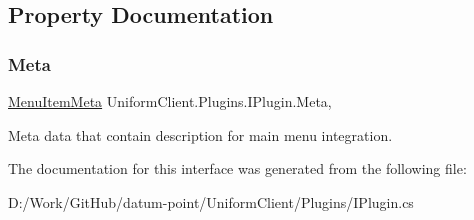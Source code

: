 \subsection{Property Documentation}
\mbox{\label{interface_uniform_client_1_1_plugins_1_1_i_plugin_aa49e267e66a3d697ded460d9281dcc3a}} 
\subsubsection{\texorpdfstring{Meta}{Meta}}
{\footnotesize\ttfamily \mbox{\hyperlink{class_uniform_client_1_1_plugins_1_1_menu_item_meta}{Menu\+Item\+Meta}} Uniform\+Client.\+Plugins.\+I\+Plugin.\+Meta\hspace{0.3cm}{\ttfamily [get]}, {\ttfamily [set]}}



Meta data that contain description for main menu integration. 



The documentation for this interface was generated from the following file\+:\begin{DoxyCompactItemize}
\item 
D\+:/\+Work/\+Git\+Hub/datum-\/point/\+Uniform\+Client/\+Plugins/I\+Plugin.\+cs\end{DoxyCompactItemize}
